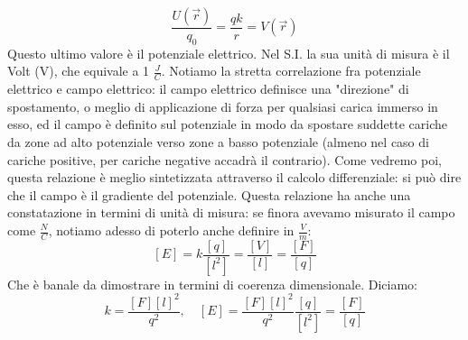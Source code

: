 \documentclass[a4paper,12pt]{article}
\begin{document}
$$ \frac{U(\vec{r})}{q_0} = \frac{qk}{r} = V(\vec{r})$$
Questo ultimo valore è il potenziale elettrico. Nel S.I. la sua unità di misura è il Volt (V), che equivale a  1 $\frac{J}{C}$. Notiamo la stretta correlazione fra potenziale elettrico e campo elettrico: il campo elettrico definisce una "direzione" di spostamento,
o meglio di applicazione di forza per qualsiasi carica immerso in esso, ed il campo è definito sul potenziale in modo da spostare suddette cariche da zone ad alto potenziale verso zone a basso potenziale (almeno nel caso di cariche positive,
per cariche negative accadrà il contrario). Come vedremo poi, questa relazione è meglio sintetizzata attraverso il calcolo differenziale: si può dire che il campo è il gradiente del potenziale. Questa relazione ha anche una constatazione
in termini di unità di misura: se finora avevamo misurato il campo come $\frac{N}{C}$, notiamo adesso di poterlo anche definire in $\frac{V}{m}$:
$$ [E] = k\frac{[q]}{[l^2]} = \frac{[V]}{[l]} = \frac{[F]}{[q]} $$
Che è banale da dimostrare in termini di coerenza dimensionale. Diciamo:
$$ k = \frac{[F][l]^2}{q^2}, \quad [E] = \frac{[F][l]^2}{q^2} \frac{[q]}{[l^2]} = \frac{[F]}{[q]} $$
\end{document}
